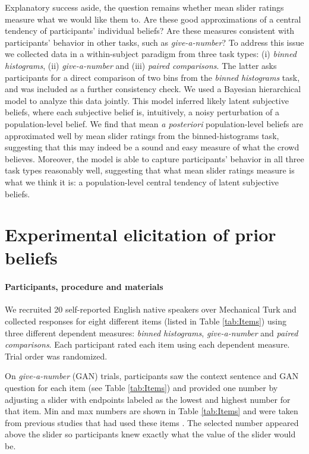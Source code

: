 \documentclass[10pt,letterpaper]{article}
\newcommand{\tableref}[1]{Table \ref{#1}}
\begin{document}
Explanatory success aside, the question remains whether mean slider ratings measure what we
would like them to. Are these good approximations of a central tendency of participants'
individual beliefs? Are these measures consistent with participants' behavior in other tasks,
such as \emph{give-a-number}? To address this issue we collected data in a
within-subject paradigm from three task types: (i) \emph{binned histograms}, (ii)
\emph{give-a-number} and (iii) \emph{paired comparisons}. The latter asks participants for a direct comparison of two bins
from the \emph{binned histograms} task, and was included as a further consistency check. 
We used a Bayesian hierarchical model to analyze this data jointly.
This model inferred likely
latent subjective beliefs, where each subjective belief is, intuitively, a noisy perturbation
of a population-level belief. We find that mean \emph{a posteriori} population-level beliefs
are approximated well by mean slider ratings from the binned-histograms task, suggesting that this may indeed be a
sound and easy measure of what the crowd believes.  
Moreover, the model is able to
capture participants' behavior in all three task types reasonably well, suggesting that what
mean slider ratings measure is what we think it is: a population-level central tendency of
latent subjective beliefs.

\section{Experimental elicitation of prior beliefs}

\paragraph{Participants, procedure and materials} We recruited 20 self-reported English native
speakers over Mechanical Turk and collected responses for eight different items (listed in
\tableref{tab:Items}) using three different dependent measures: \emph{binned histograms},
\emph{give-a-number} and \emph{paired comparisons}. Each participant rated each item using each
dependent measure. Trial order was randomized.



On \emph{give-a-number} (GAN) trials, participants saw the context sentence and GAN question
for each item (see \tableref{tab:Items}) and provided one number by adjusting a
slider with endpoints labeled as the lowest and highest number for that item. Min and max
numbers are shown in \tableref{tab:Items} and were taken from previous studies that had used
these items
\cite{DegenTessler2015:Wonky-worlds:-L,SchollerFranke2015:Semantic-values,KaoWu2014:Nonliteral-Unde}. The
selected number appeared above the slider so participants knew exactly what the value of the
slider would be.
\end{document}
